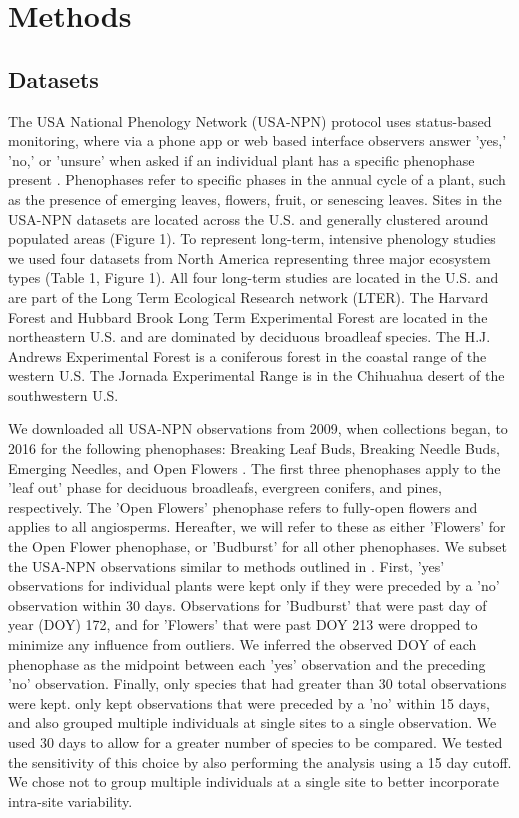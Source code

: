 \documentclass[fleqn,12pt,lineno]{article}
\begin{document}
\section*{Methods}

\subsection*{Datasets}

The USA National Phenology Network (USA-NPN) protocol uses status-based monitoring, where via a phone app or web based interface observers answer 'yes,' 'no,' or 'unsure' when asked if an individual plant has a specific phenophase present \citep{denny2014}. Phenophases refer to specific phases in the annual cycle of a plant, such as the presence of emerging leaves, flowers, fruit, or senescing leaves. Sites in the USA-NPN datasets are located across the U.S. and generally clustered around populated areas (Figure 1). To represent long-term, intensive phenology studies we used four datasets from North America representing three major ecosystem types (Table 1, Figure 1). All four long-term studies are located in the U.S. and are part of the Long Term Ecological Research network (LTER). The Harvard Forest and Hubbard Brook Long Term Experimental Forest are located in the northeastern U.S. and are dominated by deciduous broadleaf species. The H.J. Andrews Experimental Forest is a coniferous forest in the coastal range of the western U.S. The Jornada Experimental Range is in the Chihuahua desert of the southwestern U.S. 

We downloaded all USA-NPN observations from 2009, when collections began, to 2016 for the following phenophases: Breaking Leaf Buds, Breaking Needle Buds, Emerging Needles, and Open Flowers \citep{npndata}. The first three phenophases apply to the 'leaf out' phase for deciduous broadleafs, evergreen conifers, and pines, respectively. The 'Open Flowers' phenophase refers to fully-open flowers and applies to all angiosperms. Hereafter, we will refer to these as either 'Flowers' for the Open Flower phenophase, or 'Budburst' for all other phenophases. We subset the USA-NPN observations similar to methods outlined in \cite{crimmins2017}. First, 'yes' observations for individual plants were kept only if they were preceded by a 'no' observation within 30 days. Observations for 'Budburst' that were past day of year (DOY) 172, and for 'Flowers' that were past DOY 213 were dropped to minimize any influence from outliers. We inferred the observed DOY of each phenophase as the midpoint between each 'yes' observation and the preceding 'no' observation. Finally, only species that had greater than 30 total observations were kept. \cite{crimmins2017} only kept observations that were preceded by a 'no' within 15 days, and also grouped multiple individuals at single sites to a single observation. We used 30 days to allow for a greater number of species to be compared. We tested the sensitivity of this choice by also performing the analysis using a 15 day cutoff. We chose not to group multiple individuals at a single site to better incorporate intra-site variability.
\end{document}
